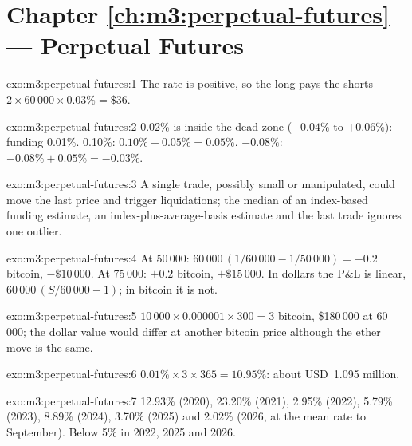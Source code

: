 \section*{Chapter \ref{ch:m3:perpetual-futures} --- Perpetual Futures}

\begin{solution}{exo:m3:perpetual-futures:1}
The rate is positive, so the long pays the shorts $2 \times 60\,000 \times 0.03\% = \$36$.
\end{solution}

\begin{solution}{exo:m3:perpetual-futures:2}
0.02\% is inside the dead zone ($-0.04\%$ to $+0.06\%$): funding 0.01\%. 0.10\%: $0.10\% - 0.05\% = 0.05\%$.
$-0.08\%$: $-0.08\% + 0.05\% = -0.03\%$.
\end{solution}

\begin{solution}{exo:m3:perpetual-futures:3}
A single trade, possibly small or manipulated, could move the last price and trigger liquidations; the median of
an index-based funding estimate, an index-plus-average-basis estimate and the last trade ignores one outlier.
\end{solution}

\begin{solution}{exo:m3:perpetual-futures:4}
At 50\,000: $60\,000\,(1/60\,000 - 1/50\,000) = -0.2$ bitcoin, $-\$10\,000$. At 75\,000: $+0.2$ bitcoin,
$+\$15\,000$. In dollars the P\&L is linear, $60\,000\,(S/60\,000 - 1)$; in bitcoin it is not.
\end{solution}

\begin{solution}{exo:m3:perpetual-futures:5}
$10\,000 \times 0.000001 \times 300 = 3$ bitcoin, \$180\,000 at 60\,000; the dollar value would differ at another
bitcoin price although the ether move is the same.
\end{solution}

\begin{solution}{exo:m3:perpetual-futures:6}
$0.01\% \times 3 \times 365 = 10.95\%$: about USD~1.095 million.
\end{solution}

\begin{solution}{exo:m3:perpetual-futures:7}
12.93\% (2020), 23.20\% (2021), 2.95\% (2022), 5.79\% (2023), 8.89\% (2024), 3.70\% (2025) and 2.02\% (2026, at the
mean rate to September). Below 5\% in 2022, 2025 and 2026.
\end{solution}

